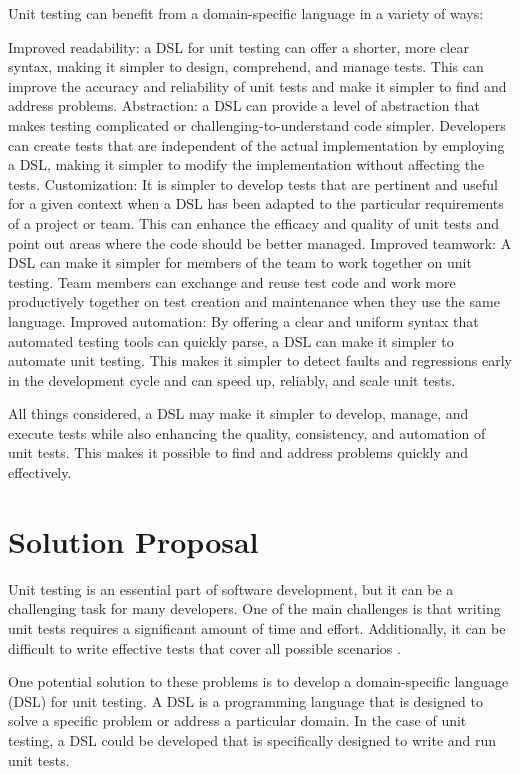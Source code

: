  Unit testing can benefit from a domain-specific language in a variety of ways:
\begin{itemize}
    \hitem Improved readability: a DSL for unit testing can offer a shorter, more clear syntax, making it simpler to design, comprehend, and manage tests. This can improve the accuracy and reliability of unit tests and make it simpler to find and address problems.
 \hitem Abstraction: a DSL can provide a level of abstraction that makes testing complicated or challenging-to-understand code simpler. Developers can create tests that are independent of the actual implementation by employing a DSL, making it simpler to modify the implementation without affecting the tests.
 \hitem Customization: It is simpler to develop tests that are pertinent and useful for a given context when a DSL has been adapted to the particular requirements of a project or team. This can enhance the efficacy and quality of unit tests and point out areas where the code should be better managed.
 \hitem Improved teamwork: A DSL can make it simpler for members of the team to work together on unit testing. Team members can exchange and reuse test code and work more productively together on test creation and maintenance when they use the same language.
 \hitem Improved automation: By offering a clear and uniform syntax that automated testing tools can quickly parse, a DSL can make it simpler to automate unit testing. This makes it simpler to detect faults and regressions early in the development cycle and can speed up, reliably, and scale unit tests.
\end{itemize}
 

All things considered, a DSL may make it simpler to develop, manage, and execute tests while also enhancing the quality, consistency, and automation of unit tests. This makes it possible to find and address problems quickly and effectively.




\section{Solution Proposal}

Unit testing is an essential part of software development, but it can be a challenging task for many developers. One of the main challenges is that writing unit tests requires a significant amount of time and effort. Additionally, it can be difficult to write effective tests that cover all possible scenarios \cite{guru99}.  

One potential solution to these problems is to develop a domain-specific language (DSL) for unit testing. A DSL is a programming language that is designed to solve a specific problem or address a particular domain. In the case of unit testing, a DSL could be developed that is specifically designed to write and run unit tests.

